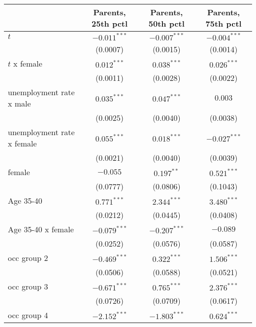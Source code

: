 \begin{tabular}{l|ccc|}
\toprule
{} & Parents, 25th pctl & Parents, 50th pctl & Parents, 75th pctl \\
\midrule
$t$                        &     $-0.011^{***}$ &     $-0.007^{***}$ &     $-0.004^{***}$ \\
                           &           (0.0007) &           (0.0015) &           (0.0014) \\
$t$ x female               &      $0.012^{***}$ &      $0.038^{***}$ &      $0.026^{***}$ \\
                           &           (0.0011) &           (0.0028) &           (0.0022) \\
unemployment rate x male   &      $0.035^{***}$ &      $0.047^{***}$ &            $0.003$ \\
                           &           (0.0025) &           (0.0040) &           (0.0038) \\
unemployment rate x female &      $0.055^{***}$ &      $0.018^{***}$ &     $-0.027^{***}$ \\
                           &           (0.0021) &           (0.0040) &           (0.0039) \\
female                     &           $-0.055$ &       $0.197^{**}$ &      $0.521^{***}$ \\
                           &           (0.0777) &           (0.0806) &           (0.1043) \\
Age 35-40                  &      $0.771^{***}$ &      $2.344^{***}$ &      $3.480^{***}$ \\
                           &           (0.0212) &           (0.0445) &           (0.0408) \\
Age 35-40 x female         &     $-0.079^{***}$ &     $-0.207^{***}$ &           $-0.089$ \\
                           &           (0.0252) &           (0.0576) &           (0.0587) \\
occ group 2                &     $-0.469^{***}$ &      $0.322^{***}$ &      $1.506^{***}$ \\
                           &           (0.0506) &           (0.0588) &           (0.0521) \\
occ group 3                &     $-0.671^{***}$ &      $0.765^{***}$ &      $2.376^{***}$ \\
                           &           (0.0726) &           (0.0709) &           (0.0617) \\
occ group 4                &     $-2.152^{***}$ &     $-1.803^{***}$ &      $0.624^{***}$ \\

\end{tabular}
